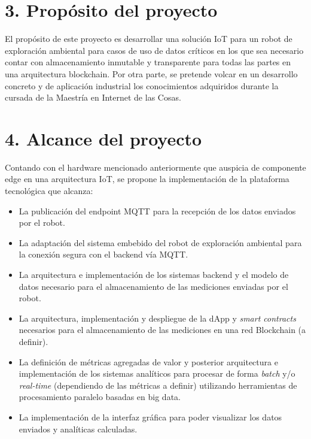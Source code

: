 \documentclass[
11pt, %
]{charter}
\begin{document}
\section{3. Propósito del proyecto}
\label{sec:proposito}

El propósito de este proyecto es desarrollar una solución IoT para un robot de exploración ambiental para casos de uso de datos críticos en los que sea necesario contar con almacenamiento inmutable y transparente para todas las partes en una arquitectura blockchain.
Por otra parte, se pretende volcar en un desarrollo concreto y de aplicación industrial los conocimientos adquiridos durante la cursada de la Maestría en Internet de las Cosas.

\section{4. Alcance del proyecto}
\label{sec:alcance}


Contando con el hardware mencionado anteriormente que auspicia de componente edge en una arquitectura IoT, se propone la implementación de la plataforma tecnológica que alcanza:

\begin{itemize}
	\item La publicación del endpoint MQTT para la recepción de los datos enviados por el robot.
	\item La adaptación del sistema embebido del robot de exploración ambiental para la conexión segura con el backend vía MQTT.
	\item La arquitectura e implementación de los sistemas backend y el modelo de datos necesario para el almacenamiento de las mediciones enviadas por el robot.
	\item La arquitectura, implementación y despliegue de la dApp y \textit{smart contracts} necesarios para el almacenamiento de las mediciones en una red Blockchain (a definir).
	\item La definición de métricas agregadas de valor y posterior arquitectura e implementación de los sistemas analíticos para procesar de forma \textit{batch} y/o \textit{real-time} (dependiendo de las métricas a definir) utilizando herramientas de procesamiento paralelo basadas en big data.
	\item La implementación de la interfaz gráfica para poder visualizar los datos enviados y analíticas calculadas.

\end{itemize}
\end{document}
